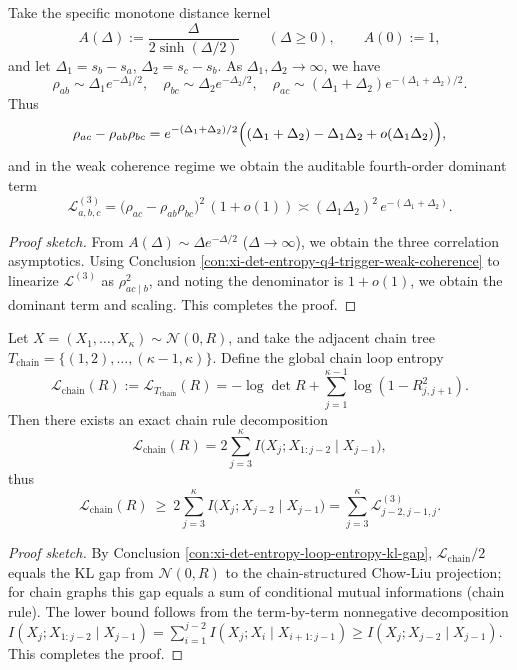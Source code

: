 \begin{conclusion}\label{con:xi-det-entropy-exp-tail-kernel-audit-asymptotics}
Take the specific monotone distance kernel
\[
A(\Delta):=\frac{\Delta}{2\sinh(\Delta/2)}\qquad(\Delta\ge0),
\qquad
A(0):=1,
\]
and let \(\Delta_1=s_b-s_a\), \(\Delta_2=s_c-s_b\).
As \(\Delta_1,\Delta_2\to\infty\), we have
\[
\rho_{ab}\sim \Delta_1e^{-\Delta_1/2},\quad
\rho_{bc}\sim \Delta_2e^{-\Delta_2/2},\quad
\rho_{ac}\sim (\Delta_1+\Delta_2)e^{-(\Delta_1+\Delta_2)/2}.
\]
Thus
\[
\rho_{ac}-\rho_{ab}\rho_{bc}
=e^{-(\Delta_1+\Delta_2)/2}\Bigl((\Delta_1+\Delta_2)-\Delta_1\Delta_2+o(\Delta_1\Delta_2)\Bigr),
\]
and in the weak coherence regime we obtain the auditable fourth-order dominant term
\[
\mathcal L^{(3)}_{a,b,c}
=\bigl(\rho_{ac}-\rho_{ab}\rho_{bc}\bigr)^2\,(1+o(1))
\asymp (\Delta_1\Delta_2)^2\,e^{-(\Delta_1+\Delta_2)}.
\]
\end{conclusion}
\begin{proof}[Proof sketch]
From \(A(\Delta)\sim \Delta e^{-\Delta/2}\) (\(\Delta\to\infty\)), we obtain the three correlation asymptotics.
Using Conclusion \ref{con:xi-det-entropy-q4-trigger-weak-coherence} to linearize \(\mathcal L^{(3)}\) as \(\rho_{ac\mid b}^2\), and noting the denominator is \(1+o(1)\), we obtain the dominant term and scaling. This completes the proof.
\end{proof}

\begin{conclusion}\label{con:xi-det-entropy-chain-loop-entropy-chain-rule}
Let \(X=(X_1,\dots,X_\kappa)\sim\mathcal N(0,R)\), and take the adjacent chain tree
\(
T_{\mathrm{chain}}=\{(1,2),\dots,(\kappa-1,\kappa)\}
\).
Define the global chain loop entropy
\[
\mathcal L_{\mathrm{chain}}(R):=\mathcal L_{T_{\mathrm{chain}}}(R)
=-\log\det R+\sum_{j=1}^{\kappa-1}\log(1-R_{j,j+1}^2).
\]
Then there exists an exact chain rule decomposition
\[
\mathcal L_{\mathrm{chain}}(R)
=2\sum_{j=3}^{\kappa} I\!\bigl(X_j;X_{1:j-2}\mid X_{j-1}\bigr),
\]
thus
\[
\mathcal L_{\mathrm{chain}}(R)\ \ge\ 2\sum_{j=3}^{\kappa} I\!\bigl(X_j;X_{j-2}\mid X_{j-1}\bigr)
=\sum_{j=3}^{\kappa}\mathcal L^{(3)}_{j-2,j-1,j}.
\]
\end{conclusion}
\begin{proof}[Proof sketch]
By Conclusion \ref{con:xi-det-entropy-loop-entropy-kl-gap}, \(\mathcal L_{\mathrm{chain}}/2\) equals the KL gap from \(\mathcal N(0,R)\) to the chain-structured Chow-Liu projection;
for chain graphs this gap equals a sum of conditional mutual informations (chain rule).
The lower bound follows from the term-by-term nonnegative decomposition
\(
I(X_j;X_{1:j-2}\mid X_{j-1})=\sum_{i=1}^{j-2}I(X_j;X_i\mid X_{i+1:j-1})\ge I(X_j;X_{j-2}\mid X_{j-1})
\). This completes the proof.
\end{proof}

